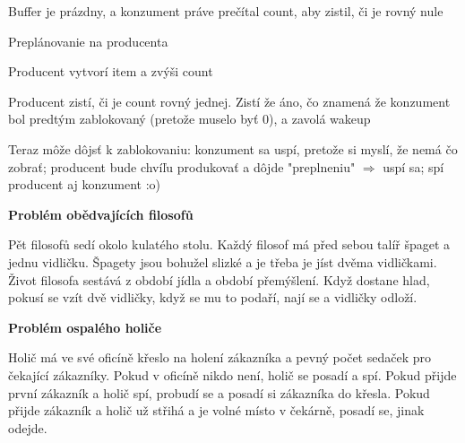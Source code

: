 \begin{penumerate}
	\item Buffer je prázdny, a konzument práve prečítal count, aby zistil, či je rovný nule
	\item Preplánovanie na producenta
	\item Producent vytvorí item a zvýši count
	\item Producent zistí, či je count rovný jednej. Zistí že áno, čo znamená že konzument bol predtým zablokovaný (pretože muselo byť 0), a zavolá wakeup
	\item Teraz môže dôjsť k zablokovaniu: konzument sa uspí, pretože si myslí, že nemá čo zobrať; producent bude chvíľu produkovať a dôjde "preplneniu" $\Rightarrow$ uspí sa; spí producent aj konzument :o) 
\end{penumerate}

\textbf{Problém obědvajících filosofů}
\par Pět filosofů sedí okolo kulatého stolu. Každý filosof má před sebou talíř špaget a jednu vidličku. Špagety jsou bohužel slizké a je třeba je jíst dvěma vidličkami. Život filosofa sestává z období jídla a období přemýšlení. Když dostane hlad, pokusí se vzít dvě vidličky, když se mu to podaří, nají se a vidličky odloží.

\textbf{Problém ospalého holiče}
\par Holič má ve své oficíně křeslo na holení zákazníka a pevný počet sedaček pro čekající zákazníky. Pokud v oficíně nikdo není, holič se posadí a spí. Pokud přijde první zákazník a holič spí, probudí se a posadí si zákazníka do křesla. Pokud přijde zákazník a holič už střihá a je volné místo v čekárně, posadí se, jinak odejde.
